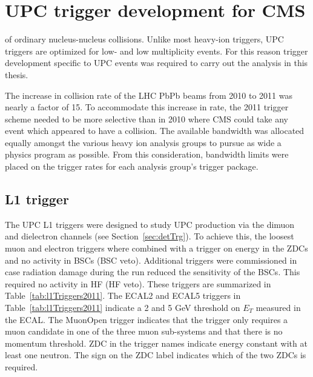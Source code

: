 \chapter{\label{ch:trigg}UPC trigger development for CMS}
  \DIFdelbegin {}\DIFdelend \DIFaddbegin {}\DIFaddend of ordinary nucleus-nucleus collisions.
  \DIFaddbegin {}\DIFaddend Unlike most heavy-ion triggers, UPC triggers are optimized for low-\pt{} 
    and low multiplicity events. 
  For this reason trigger development specific to UPC events was required to
    carry out the analysis in this thesis.

  The increase in collision rate of the LHC PbPb beams from 2010 to 2011 was
    nearly a factor of 15. 
  To accommodate this increase in rate, the 2011 trigger scheme needed to be 
    more selective than in 2010 where CMS could take any event which 
    appeared to have a collision.
  The available bandwidth was allocated equally amongst the various heavy ion
    analysis groups to pursue as wide a physics program as possible.
  From this consideration, bandwidth limits were placed on the trigger rates
    for each analysis group's trigger package. 

  \section{\label{sec:l1Trigger}L1 trigger}
    The UPC L1 triggers were designed to study UPC \JPsi{} production via the 
      dimuon and dielectron channels (see Section~\ref{sec:detTrg}).
    To achieve this, the loosest muon and electron triggers where combined with
      a trigger on energy in the ZDCs and no activity in BSCs (BSC veto).
    Additional triggers were commissioned in case radiation damage during the 
      run reduced the sensitivity of the BSCs.
    This required no activity in HF (HF veto). 
    These triggers are summarized in Table~\ref{tab:l1Triggers2011}.
    The ECAL2 and ECAL5 triggers in Table~\ref{tab:l1Triggers2011}
      indicate a 2 and 5 GeV threshold on $E_{T}$ measured in the ECAL.
    The MuonOpen trigger indicates that the trigger only 
      requires a muon candidate in one of the three muon sub-systems and that
      there is no momentum threshold.
    ZDC in the trigger names indicate energy constant with at least one neutron.
    The sign on the ZDC label indicates which of the two ZDCs is required. 

